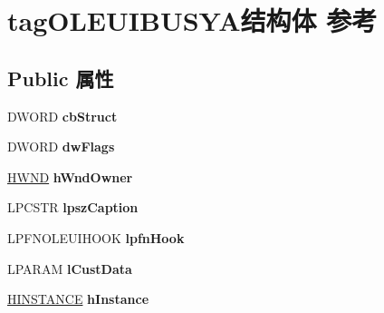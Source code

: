 \hypertarget{structtag_o_l_e_u_i_b_u_s_y_a}{}\section{tag\+O\+L\+E\+U\+I\+B\+U\+S\+Y\+A结构体 参考}
\label{structtag_o_l_e_u_i_b_u_s_y_a}
\subsection*{Public 属性}
\begin{DoxyCompactItemize}
\item 
\mbox{\label{structtag_o_l_e_u_i_b_u_s_y_a_aca8209edb163da9334a9524dc7deba7a}} 
D\+W\+O\+RD {\bfseries cb\+Struct}
\item 
\mbox{\label{structtag_o_l_e_u_i_b_u_s_y_a_a8f6daad751fe85a80e37d2a4b1b5fbf1}} 
D\+W\+O\+RD {\bfseries dw\+Flags}
\item 
\mbox{\label{structtag_o_l_e_u_i_b_u_s_y_a_ad6b0004ee4c01ae4e543832dbbb4bb6a}} 
\hyperlink{interfacevoid}{H\+W\+ND} {\bfseries h\+Wnd\+Owner}
\item 
\mbox{\label{structtag_o_l_e_u_i_b_u_s_y_a_a27021d9c0081ed76bf007ed52b9152a5}} 
L\+P\+C\+S\+TR {\bfseries lpsz\+Caption}
\item 
\mbox{\label{structtag_o_l_e_u_i_b_u_s_y_a_a0359a83af6f5b71b9dd71c92f7dc1ec4}} 
L\+P\+F\+N\+O\+L\+E\+U\+I\+H\+O\+OK {\bfseries lpfn\+Hook}
\item 
\mbox{\label{structtag_o_l_e_u_i_b_u_s_y_a_a1b69709b30d5dd478e3f86feac5b42f9}} 
L\+P\+A\+R\+AM {\bfseries l\+Cust\+Data}
\item 
\mbox{\label{structtag_o_l_e_u_i_b_u_s_y_a_a32315faaef80ce697e94173200fa3ec9}} 
\hyperlink{interfacevoid}{H\+I\+N\+S\+T\+A\+N\+CE} {\bfseries h\+Instance}
\item 
\mbox{\label{structtag_o_l_e_u_i_b_u_s_y_a_af7d4f27f5fa7e6eb66e27fc045e28ceb}} 

\end{DoxyCompactItemize}
